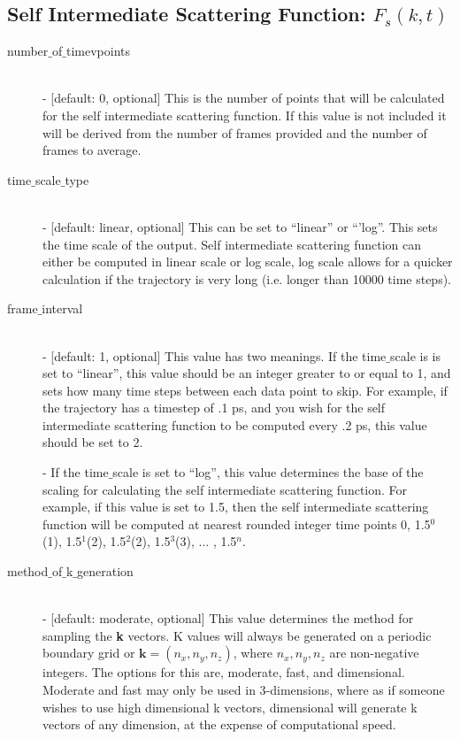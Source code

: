 \documentclass{article}
\begin{document}
\subsection{Self Intermediate Scattering Function: $F_s(k,t)$} \label{sec::Fsqt_parm}
\begin{description}	
	\item[number$\_$of$\_$timevpoints]\hfill \\
	- [default: 0, optional] This is the number of points that will be calculated for the self intermediate scattering function.  If this value is not included it will be derived from the number of frames provided and the number of frames to average.
	
	\item[time$\_$scale$\_$type] \hfill \\
	- [default: linear, optional] This can be set to ``linear'' or ``'log''.  This sets the time scale of the output. Self intermediate scattering function can either be computed in linear scale or log scale, log scale allows for a quicker calculation if the trajectory is very long (i.e. longer than 10000 time steps).
	
	\item[frame$\_$interval] \hfill \\
	- [default: 1, optional] This value has two meanings.  If the time$\_$scale is is set to ``linear'', this value should be an integer greater to or equal to 1, and sets how many time steps between each data point to skip.  For example, if the trajectory has a timestep of .1 ps, and you wish for the self intermediate scattering function to be computed every .2 ps, this value should be set to 2. 
	
	- If the time$\_$scale is set to ``log'', this value determines the base of the scaling for calculating the self intermediate scattering function.  For example, if this value is set to 1.5, then the self intermediate scattering function will be computed at nearest rounded integer time points 0, 1.5$^0$(1), 1.5$^1$(2), 1.5$^2$(2), 1.5$^3$(3), ... , 1.5$^{n}$.
	
	\item[method$\_$of$\_$k$\_$generation] \hfill \\
	- [default: moderate, optional] This value determines the method for sampling the \textbf{k} vectors.  K values will always be generated on a periodic boundary grid or $\mathbf{k} = (n_x,n_y,n_z)$, where $n_x, n_y, n_z$ are non-negative integers.  The options for this are, moderate, fast, and dimensional.  Moderate and fast may only be used in 3-dimensions, where as if someone wishes to use high dimensional k vectors, dimensional will generate k vectors of any dimension, at the expense of computational speed.
	

\end{description}
\end{document}
